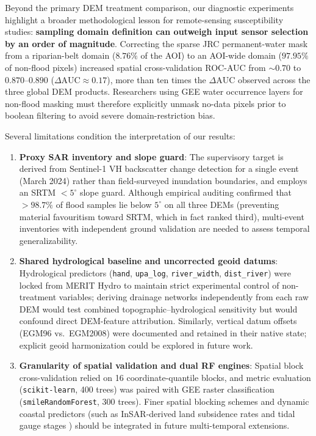 \documentclass[11pt,twoside]{article}
\begin{document}
Beyond the primary DEM treatment comparison, our diagnostic experiments highlight a broader methodological lesson for remote-sensing susceptibility studies: \textbf{sampling domain definition can outweigh input sensor selection by an order of magnitude}. Correcting the sparse JRC permanent-water mask from a riparian-belt domain ($8.76\%$ of the AOI) to an AOI-wide domain ($97.95\%$ of non-flood pixels) increased spatial cross-validation ROC-AUC from $\sim 0.70$ to $0.870\text{--}0.890$ ($\Delta\text{AUC} \approx 0.17$), more than ten times the $\Delta\text{AUC}$ observed across the three global DEM products. Researchers using GEE water occurrence layers for non-flood masking must therefore explicitly unmask no-data pixels prior to boolean filtering to avoid severe domain-restriction bias.

Several limitations condition the interpretation of our results:
\begin{enumerate}
\item \textbf{Proxy SAR inventory and slope guard}: The supervisory target is derived from Sentinel-1 VH backscatter change detection for a single event (March 2024) rather than field-surveyed inundation boundaries, and employs an SRTM $<5^\circ$ slope guard. Although empirical auditing confirmed that $>98.7\%$ of flood samples lie below $5^\circ$ on all three DEMs (preventing material favouritism toward SRTM, which in fact ranked third), multi-event inventories with independent ground validation are needed to assess temporal generalizability.
\item \textbf{Shared hydrological baseline and uncorrected geoid datums}: Hydrological predictors (\texttt{hand}, \texttt{upa\_log}, \texttt{river\_width}, \texttt{dist\_river}) were locked from MERIT Hydro \cite{yamazaki2019} to maintain strict experimental control of non-treatment variables; deriving drainage networks independently from each raw DEM would test combined topographic--hydrological sensitivity \cite{Tique2026} but would confound direct DEM-feature attribution. Similarly, vertical datum offsets (EGM96 vs.\ EGM2008) were documented and retained in their native state; explicit geoid harmonization could be explored in future work.
\item \textbf{Granularity of spatial validation and dual RF engines}: Spatial block cross-validation relied on 16 coordinate-quantile blocks, and metric evaluation (\texttt{scikit-learn}, 400 trees) was paired with GEE raster classification (\texttt{smileRandomForest}, 300 trees). Finer spatial blocking schemes and dynamic coastal predictors (such as InSAR-derived land subsidence rates and tidal gauge stages \cite{abidin2015,yuwono2024}) should be integrated in future multi-temporal extensions.
\end{enumerate}
\end{document}
